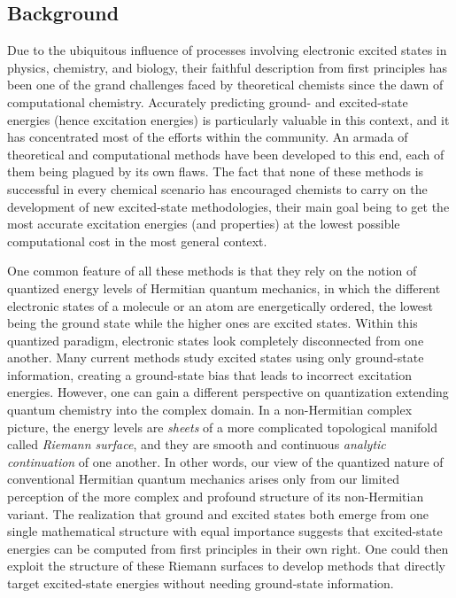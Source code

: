 \documentclass[11pt,a4paper]{article}
\begin{document}
\subsection{Background}

Due to the ubiquitous influence of processes involving electronic excited states in physics, chemistry, and biology, their faithful description from first principles has been one of the grand challenges faced by theoretical chemists since the dawn of computational chemistry. 
Accurately predicting ground- and excited-state energies (hence excitation energies) is particularly valuable in this context, and it has concentrated most of the efforts within the community.
An armada of theoretical and computational methods have been developed to this end, each of them being plagued by its own flaws. 
The fact that none of these methods is successful in every chemical scenario has encouraged chemists to carry on the development of new excited-state methodologies, their main goal being to get the most accurate excitation energies (and properties) at the lowest possible computational cost in the most general context.

One common feature of all these methods is that they rely on the notion of quantized energy levels of Hermitian quantum mechanics, in which the different electronic states of a molecule or an atom are energetically ordered, the lowest being the ground state while the higher ones are excited states. 
Within this quantized paradigm, electronic states look completely disconnected from one another.
Many current methods study excited states using only ground-state information, creating a ground-state bias that leads to incorrect excitation energies.
However, one can gain a different perspective on quantization extending quantum chemistry into the complex domain.
In a non-Hermitian complex picture, the energy levels are \textit{sheets} of a more complicated topological manifold called \textit{Riemann surface}, and they are smooth and continuous \textit{analytic continuation} of one another.
In other words, our view of the quantized nature of conventional Hermitian quantum mechanics arises only from our limited perception of the more complex and profound structure of its non-Hermitian variant.
The realization that ground and excited states both emerge from one single mathematical structure with equal importance suggests that excited-state energies can be computed from first principles in their own right.
One could then exploit the structure of these Riemann surfaces to develop methods that directly target excited-state energies without needing ground-state information.
\end{document}
